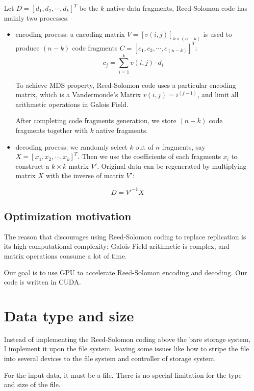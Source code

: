 \documentclass[a4paper]{article}
\begin{document}
Let $D = [d_{1}, d_{2}, \cdots, d_{k}]^{T}$ be the $k$ native data fragments, 
Reed-Solomon code has mainly two processes:
\begin{itemize}
\item encoding process: 
a encoding matrix $V = [v(i,j)]_{k \times (n-k)}$
is used to produce $(n-k)$ code fragments $C = [c_{1}, c_{2}, \cdots, c_{(n-k)}]^{T}$:
$$
c_{j} = \sum_{i = 1}^{k} v(i,j) \cdot d_{i}
$$

To achieve MDS property,
Reed-Solomon code uses a particular encoding matrix,
which is a Vandermonde's Matrix $v(i,j) = i^{(j-1)}$,
and limit all arithmetic operations in Galois Field.

After completing code fragments generation, we store $(n-k)$ code fragments together with $k$ native fragments.

\item decoding process: 
we randomly select $k$ out of $n$ fragments, say $X = [x_{1}, x_{2}, \cdots, x_{k}]^{T}$.
Then we use the coefficients of each fragments $x_{i}$ to construct a $k \times k$ matrix $V'$.
Original data can be regenerated by multiplying matrix $X$ with the inverse of matrix $V'$:
\end{itemize}
$$
D = V'^{-1} X 
$$

\subsection{Optimization motivation}
The reason that discourages using Reed-Solomon coding to replace replication is its high computational complexity:
Galois Field arithmetic is complex, and matrix operations consume a lot of time. 

Our goal is to use GPU to accelerate Reed-Solomon encoding and decoding. Our code is written in CUDA.

\section{Data type and size}
Instead of implementing the Reed-Solomon coding above the bare storage system, 
I implement it upon the file system. 
leaving some issues like how to stripe the file into several devices to the file system and controller of storage system.

For the input data, it must be a file. There is no special limitation for the type and size of the file.
\end{document}
